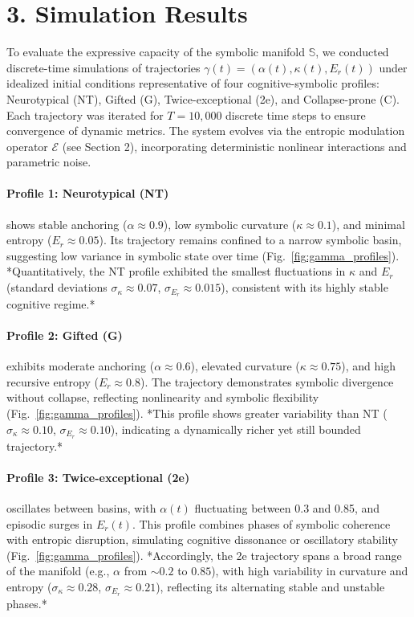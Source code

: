 \section*{3. Simulation Results}

To evaluate the expressive capacity of the symbolic manifold $\mathbb{S}$, we conducted discrete-time simulations of trajectories $\gamma(t) = (\alpha(t), \kappa(t), E_r(t))$ under idealized initial conditions representative of four cognitive-symbolic profiles: Neurotypical (NT), Gifted (G), Twice-exceptional (2e), and Collapse-prone (C). Each trajectory was iterated for $T=10{,}000$ discrete time steps to ensure convergence of dynamic metrics. The system evolves via the entropic modulation operator $\mathcal{E}$ (see Section 2), incorporating deterministic nonlinear interactions and parametric noise.

\paragraph{Profile 1: Neurotypical (NT)} shows stable anchoring ($\alpha \approx 0.9$), low symbolic curvature ($\kappa \approx 0.1$), and minimal entropy ($E_r \approx 0.05$). Its trajectory remains confined to a narrow symbolic basin, suggesting low variance in symbolic state over time (Fig.~\ref{fig:gamma_profiles}). *Quantitatively, the NT profile exhibited the smallest fluctuations in $\kappa$ and $E_r$ (standard deviations $\sigma_{\kappa}\approx0.07$, $\sigma_{E_r}\approx0.015$), consistent with its highly stable cognitive regime.*

\paragraph{Profile 2: Gifted (G)} exhibits moderate anchoring ($\alpha \approx 0.6$), elevated curvature ($\kappa \approx 0.75$), and high recursive entropy ($E_r \approx 0.8$). The trajectory demonstrates symbolic divergence without collapse, reflecting nonlinearity and symbolic flexibility (Fig.~\ref{fig:gamma_profiles}). *This profile shows greater variability than NT ($\sigma_{\kappa}\approx0.10$, $\sigma_{E_r}\approx0.10$), indicating a dynamically richer yet still bounded trajectory.*

\paragraph{Profile 3: Twice-exceptional (2e)} oscillates between basins, with $\alpha(t)$ fluctuating between 0.3 and 0.85, and episodic surges in $E_r(t)$. This profile combines phases of symbolic coherence with entropic disruption, simulating cognitive dissonance or oscillatory stability (Fig.~\ref{fig:gamma_profiles}). *Accordingly, the 2e trajectory spans a broad range of the manifold (e.g., $\alpha$ from $\sim0.2$ to $0.85$), with high variability in curvature and entropy ($\sigma_{\kappa}\approx0.28$, $\sigma_{E_r}\approx0.21$), reflecting its alternating stable and unstable phases.*

